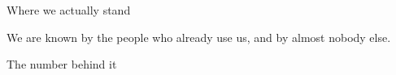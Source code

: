 \begin{frame}{Where we actually stand}
  \begin{pullquote}
  We are known by the people who already use us, and by almost nobody else.
  \end{pullquote}
\end{frame}

\begin{frame}{The number behind it}
\end{frame}
